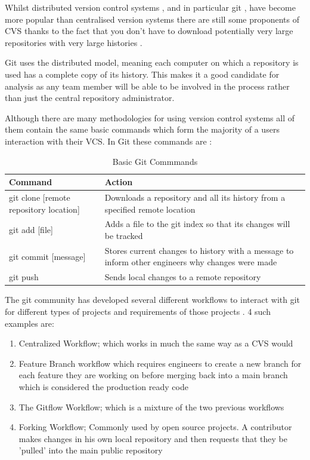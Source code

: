 \documentclass[11pt]{book}
\begin{document}
Whilst distributed version control systems \cite{whydistributed}, and in particular git \cite{gitpopularity}, have become more popular than centralised version systems there are still some proponents of CVS thanks to the fact that you don't have to download potentially very large repositories with very large histories \cite{cvsvsvcs}.

Git uses the distributed model, meaning each computer on which a repository is used has a complete copy of its history. This makes it a good candidate for analysis as any team member will be able to be involved in the process rather than just the central repository administrator.

Although there are many methodologies for using version control systems all of them contain the same basic commands which form the majority of a users interaction with their VCS. In Git these commands are \cite{gitrefbasic}: 

\begin{table}[h]
\centering
\begin{tabular}{| l | p{9cm} |}
\hline
\textbf{Command} & \textbf{Action} \\ \hline
git clone [remote repository location] & Downloads a repository and all its history from a specified remote location \\ \hline
git add [file] & Adds a file to the git index so that its changes will be tracked \\ \hline
git commit [message] & Stores current changes to history with a message to inform other engineers why changes were made \\ \hline
git push & Sends local changes to a remote repository \\ \hline
\end{tabular}
\caption{Basic Git Commmands}
\label{tab:basic-git-commands}
\end{table}

The git community has developed several different workflows to interact with git for different types of projects and requirements of those projects \cite{gitcomparingworkflows}. 4 such examples are: 

\begin{enumerate}
	\item Centralized Workflow; which works in much the same way as a CVS would
	\item Feature Branch workflow which requires engineers to create a new branch for each feature they are working on before merging back into a main branch which is considered the production ready code
	\item The Gitflow Workflow; which is a mixture of the two previous workflows
	\item Forking Workflow; Commonly used by open source projects. A contributor makes changes in his own local repository and then requests that they be 'pulled' into the main public repository
\end{enumerate}
\end{document}
